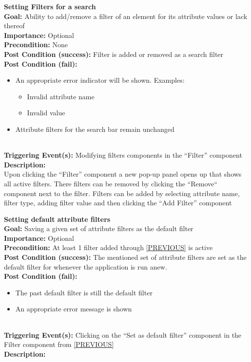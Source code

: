 \documentclass[10pt,a4paper]{report}
\newcommand{\precondition}[1]{
    \textbf{Precondition: } #1 \leavevmode \\
}
\newcommand{\FRDescription}[8]{
    \textbf{#1} \leavevmode \\
    \textbf{Goal: } #2 \leavevmode \\
    \textbf{Importance: } #3 \leavevmode \\
    \precondition{#4}
    \textbf{Post Condition (success): } #5 \leavevmode \\
    \textbf{Post Condition (fail): } #6 \leavevmode \\
    \textbf{Triggering Event(s): } #7 \leavevmode \\
    \textbf{Description: } \leavevmode \\ 
    #8}
\newcommand{\FRODescription}[8]{
    \textbf{#1} \leavevmode \\
    \textbf{Goal: } #2 \leavevmode \\
    \textbf{Importance: } #3 \leavevmode \\
    \precondition{#4}
    \textbf{Post Condition (success): } #5 \leavevmode \\
    \textbf{Post Condition (fail): } #6 \leavevmode \\
    \textbf{Triggering Event(s): } #7 \leavevmode \\
    \textbf{Description: } \leavevmode \\
    #8}
\begin{document}
\begin{FRO}
{\begin{itemize}
    \end{itemize}}
    \item \FRDescription{Setting Filters for a search}
    {Ability to add/remove a filter of an element for its attribute values or lack thereof}
    {Optional}
    {None}
    {Filter is added or removed as a search filter}
    {\begin{itemize}
        \item An appropriate error indicator will be shown. Examples:
        \begin{itemize}
            \item Invalid attribute name
            \item Invalid value
        \end{itemize}
        \item Attribute filters for the search bar remain unchanged
    \end{itemize}}
    {Modifying filters components in the “Filter” component}
    {Upon clicking the “Filter” component a new pop-up panel opens up that shows all active filters. There filters can be removed by clicking the “Remove“ component next to the filter. Filters can be added by selecting attribute name, filter type, adding filter value and then clicking the “Add Filter” component}
    \item \FRODescription{Setting default attribute filters}
    {Saving a given set of attribute filters as the default filter}
    {Optional}
    {At least 1 filter added through \ref{PREVIOUS} is active}
    {The mentioned set of attribute filters are set as the default filter for whenever the application is run anew.}
    {\begin{itemize}
        \item The past default filter is still the default filter
        \item An appropriate error message is shown
    \end{itemize}}
    {Clicking on the “Set as default filter” component in the Filter component from \ref{PREVIOUS}}
\end{FRO}
\end{document}
